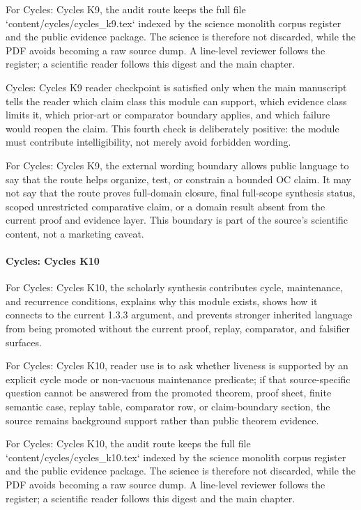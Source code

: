 For Cycles: Cycles K9, the audit route keeps the full file `content/cycles/cycles\_k9.tex` indexed by the science monolith corpus register and the public evidence package. The science is therefore not discarded, while the PDF avoids becoming a raw source dump. A line-level reviewer follows the register; a scientific reader follows this digest and the main chapter.


Cycles: Cycles K9 reader checkpoint is satisfied only when the main manuscript tells the reader which claim class this module can support, which evidence class limits it, which prior-art or comparator boundary applies, and which failure would reopen the claim. This fourth check is deliberately positive: the module must contribute intelligibility, not merely avoid forbidden wording.


For Cycles: Cycles K9, the external wording boundary allows public language to say that the route helps organize, test, or constrain a bounded OC claim. It may not say that the route proves full-domain closure, final full-scope synthesis status, scoped unrestricted comparative claim, or a domain result absent from the current proof and evidence layer. This boundary is part of the source's scientific content, not a marketing caveat.


\paragraph{Cycles: Cycles K10}

For Cycles: Cycles K10, the scholarly synthesis contributes cycle, maintenance, and recurrence conditions, explains why this module exists, shows how it connects to the current 1.3.3 argument, and prevents stronger inherited language from being promoted without the current proof, replay, comparator, and falsifier surfaces.


For Cycles: Cycles K10, reader use is to ask whether liveness is supported by an explicit cycle mode or non-vacuous maintenance predicate; if that source-specific question cannot be answered from the promoted theorem, proof sheet, finite semantic case, replay table, comparator row, or claim-boundary section, the source remains background support rather than public theorem evidence.


For Cycles: Cycles K10, the audit route keeps the full file `content/cycles/cycles\_k10.tex` indexed by the science monolith corpus register and the public evidence package. The science is therefore not discarded, while the PDF avoids becoming a raw source dump. A line-level reviewer follows the register; a scientific reader follows this digest and the main chapter.


